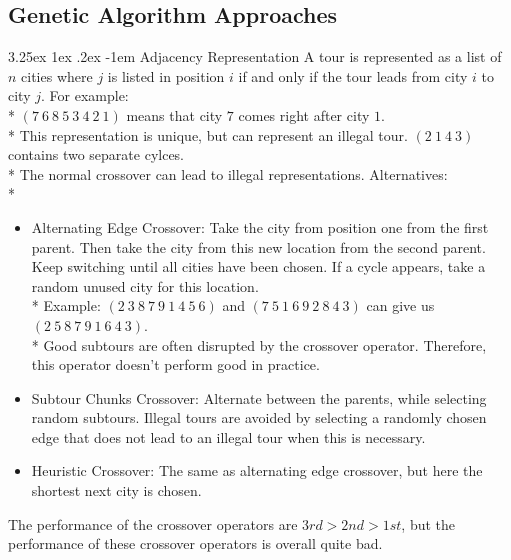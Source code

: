 \documentclass[12pt]{book}
\makeatletter
\newcounter{subsubsubsection}[subsubsection]
\renewcommand\paragraph{\@startsection{paragraph}{5}{\z@}%
  {3.25ex \@plus1ex \@minus.2ex}%
  {-1em}%
  {\normalfont\normalsize\bfseries}}
\makeatother
\begin{document}
\subsection{Genetic Algorithm Approaches}
\paragraph{Adjacency Representation}
A tour is represented as a list of $n$ cities where $j$ is listed in position $i$ if and only if the tour leads from city $i$ to city $j$. For example:\\*
$(7\ 6\ 8\ 5\ 3\ 4\ 2\ 1)$ means that city $7$ comes right after city $1$.\\*
This representation is unique, but can represent an illegal tour. $(2\ 1\ 4\ 3)$ contains two separate cylces.\\*
The normal crossover can lead to illegal representations. Alternatives:\\*
\begin{itemize}
\item Alternating Edge Crossover: Take the city from position one from the first parent. Then take the city from this new location from the second parent. Keep switching until all cities have been chosen. If a cycle appears, take a random unused city for this location.\\*
Example: $(2\ 3\ 8\ 7\ 9\ 1\ 4\ 5\ 6)$ and $(7\ 5\ 1\ 6\ 9\ 2\ 8\ 4\ 3)$ can give us $(2\ 5\ 8\ 7\ 9\ 1\ 6\ 4\ 3)$.\\*
Good subtours are often disrupted by the crossover operator. Therefore, this operator doesn't perform good in practice.
\item Subtour Chunks Crossover: Alternate between the parents, while selecting random subtours. Illegal tours are avoided by selecting a randomly chosen edge that does not lead to an illegal tour when this is necessary.
\item Heuristic Crossover: The same as alternating edge crossover, but here the shortest next city is chosen.
\end{itemize}
The performance of the crossover operators are $3rd > 2nd > 1st$, but the performance of these crossover operators is overall quite bad.\\
\end{document}
